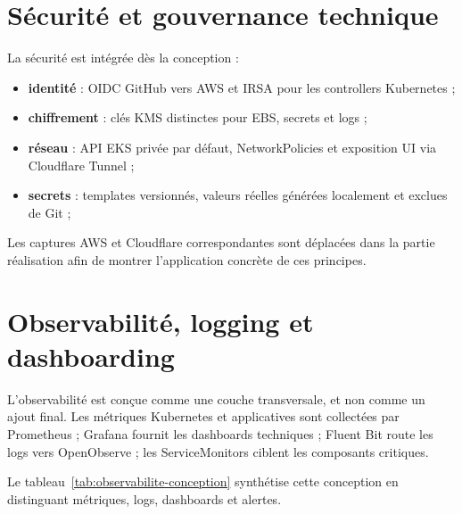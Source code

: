 \section{Sécurité et gouvernance technique}

La sécurité est intégrée dès la conception :
\begin{itemize}
    \item \textbf{identité} : OIDC GitHub vers AWS et IRSA pour les controllers Kubernetes ;
    \item \textbf{chiffrement} : clés KMS distinctes pour EBS, secrets et logs ;
    \item \textbf{réseau} : API EKS privée par défaut, NetworkPolicies et exposition UI via Cloudflare Tunnel ;
    \item \textbf{secrets} : templates versionnés, valeurs réelles générées localement et exclues de Git ;
\end{itemize}

Les captures AWS et Cloudflare correspondantes sont déplacées dans la partie réalisation afin de montrer l'application concrète de ces principes.

\section{Observabilité, logging et dashboarding}

L'observabilité est conçue comme une couche transversale, et non comme un ajout final. Les métriques Kubernetes et applicatives sont collectées par Prometheus ; Grafana fournit les dashboards techniques ; Fluent Bit route les logs vers OpenObserve ; les ServiceMonitors ciblent les composants critiques.

Le tableau~\ref{tab:observabilite-conception} synthétise cette conception en distinguant métriques, logs, dashboards et alertes.

